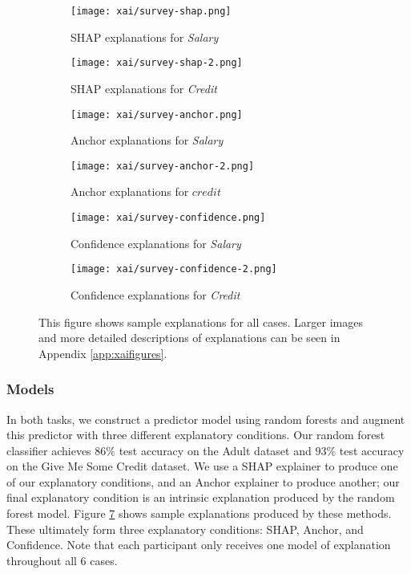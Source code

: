 \begin{figure}[htbp]
    \centering
    \begin{subfigure}[b]{0.45\textwidth}
        \texttt{[image: xai/survey-shap.png]}
        \caption{SHAP explanations for \emph{Salary}}
        \label{fig:shapsalary}
    \end{subfigure}
    \hfill
    \begin{subfigure}[b]{0.45\textwidth}
        \texttt{[image: xai/survey-shap-2.png]}
        \caption{SHAP explanations for \emph{Credit}}
        \label{fig:shapcredit}
    \end{subfigure}
    \medskip
    \begin{subfigure}[b]{0.45\textwidth}
        \texttt{[image: xai/survey-anchor.png]}
        \caption{Anchor explanations for \emph{Salary}}
        \label{fig:anchorsalary}
    \end{subfigure}
    \hfill
    \begin{subfigure}[b]{0.45\textwidth}
        \texttt{[image: xai/survey-anchor-2.png]}
        \caption{Anchor explanations for $credit$}
        \label{fig:anchorcredit}
    \end{subfigure}
    \medskip
    \begin{subfigure}[b]{0.45\textwidth}
        \texttt{[image: xai/survey-confidence.png]}
        \caption{Confidence explanations for \emph{Salary}}
        \label{fig:confidencesalary}
    \end{subfigure}
    \hfill
    \begin{subfigure}[b]{0.45\textwidth}
        \texttt{[image: xai/survey-confidence-2.png]}
        \caption{Confidence explanations for \emph{Credit}}
        \label{fig:confidencecredit}
    \end{subfigure}
    \caption{This figure shows sample explanations for all cases. Larger images and more detailed descriptions of explanations can be seen in Appendix \ref{app:xaifigures}.}
    \label{fig:online_explanations}
\end{figure}

\subsubsection{Models}
In both tasks, we construct a predictor model using random forests and augment this predictor with three different explanatory conditions. Our random forest classifier achieves $86\%$ test accuracy on the Adult dataset and $93\%$ test accuracy on the Give Me Some Credit dataset. We use a SHAP explainer to produce one of our explanatory conditions, and an Anchor explainer to produce another; our final explanatory condition is an intrinsic explanation produced by the random forest model. Figure \ref{fig:online_explanations} shows sample explanations produced by these methods. These ultimately form three explanatory conditions: SHAP, Anchor, and Confidence. Note that each participant only receives one model of explanation throughout all 6 cases. 

